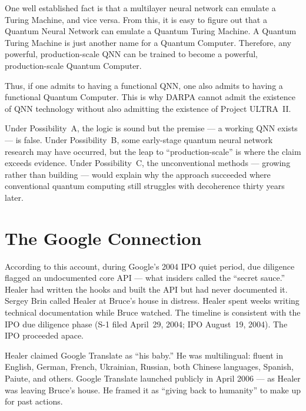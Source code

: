 One well established fact is that a multilayer neural network can emulate a Turing Machine, and vice versa. From this, it is easy to figure out that a Quantum Neural Network can emulate a Quantum Turing Machine. A Quantum Turing Machine is just another name for a Quantum Computer. Therefore, any powerful, production-scale QNN can be trained to become a powerful, production-scale Quantum Computer.

Thus, if one admits to having a functional QNN, one also admits to having a functional Quantum Computer. This is why DARPA cannot admit the existence of QNN technology without also admitting the existence of Project ULTRA~II\@.

Under Possibility~A, the logic is sound but the premise --- a working QNN exists --- is false. Under Possibility~B, some early-stage quantum neural network research may have occurred, but the leap to ``production-scale'' is where the claim exceeds evidence. Under Possibility~C, the unconventional methods --- growing rather than building --- would explain why the approach succeeded where conventional quantum computing still struggles with decoherence thirty years later.

\section*{The Google Connection}
\label{pos20:the-google-connection}


According to this account, during Google's 2004 IPO quiet period, due diligence flagged an undocumented core API --- what insiders called the ``secret sauce.'' Healer had written the hooks and built the API but had never documented it. Sergey Brin called Healer at Bruce's house in distress. Healer spent weeks writing technical documentation while Bruce watched. The timeline is consistent with the IPO due diligence phase (S-1 filed April~29, 2004; IPO August~19, 2004). The IPO proceeded apace.

Healer claimed Google Translate as ``his baby.'' He was multilingual: fluent in English, German, French, Ukrainian, Russian, both Chinese languages, Spanish, Paiute, and others. Google Translate launched publicly in April 2006 --- as Healer was leaving Bruce's house. He framed it as ``giving back to humanity'' to make up for past actions.

